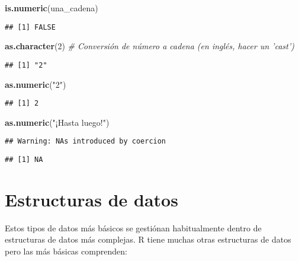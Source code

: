 \documentclass[
]{book}
\newenvironment{Shaded}{\begin{snugshade}}{\end{snugshade}}
\newcommand{\CommentTok}[1]{\textcolor[rgb]{0.56,0.35,0.01}{\textit{#1}}}
\newcommand{\DecValTok}[1]{\textcolor[rgb]{0.00,0.00,0.81}{#1}}
\newcommand{\KeywordTok}[1]{\textcolor[rgb]{0.13,0.29,0.53}{\textbf{#1}}}
\newcommand{\NormalTok}[1]{#1}
\newcommand{\StringTok}[1]{\textcolor[rgb]{0.31,0.60,0.02}{#1}}
\begin{document}
\begin{Shaded}
\begin{Highlighting}[]
\KeywordTok{is.numeric}\NormalTok{(una_cadena)}
\end{Highlighting}
\end{Shaded}

\begin{verbatim}
## [1] FALSE
\end{verbatim}

\begin{Shaded}
\begin{Highlighting}[]
\KeywordTok{as.character}\NormalTok{(}\DecValTok{2}\NormalTok{) }\CommentTok{# Conversión de número a cadena (en inglés, hacer un 'cast')}
\end{Highlighting}
\end{Shaded}

\begin{verbatim}
## [1] "2"
\end{verbatim}

\begin{Shaded}
\begin{Highlighting}[]
\KeywordTok{as.numeric}\NormalTok{(}\StringTok{"2"}\NormalTok{)}
\end{Highlighting}
\end{Shaded}

\begin{verbatim}
## [1] 2
\end{verbatim}

\begin{Shaded}
\begin{Highlighting}[]
\KeywordTok{as.numeric}\NormalTok{(}\StringTok{"¡Hasta luego!"}\NormalTok{)}
\end{Highlighting}
\end{Shaded}

\begin{verbatim}
## Warning: NAs introduced by coercion
\end{verbatim}

\begin{verbatim}
## [1] NA
\end{verbatim}

\hypertarget{estructuras-de-datos}{%
\section{Estructuras de datos}\label{estructuras-de-datos}}

Estos tipos de datos más básicos se gestiónan habitualmente dentro de estructuras de datos más complejas. R tiene muchas otras estructuras de datos pero las más básicas comprenden:
\end{document}
